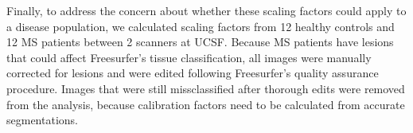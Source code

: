 Finally, to address the concern about whether these scaling factors could apply to a disease population, we calculated scaling factors from 12 healthy controls and 12 MS patients between 2 scanners at UCSF. Because MS patients have lesions that could affect Freesurfer's tissue classification, all images were manually corrected for lesions and were edited following Freesurfer's quality assurance procedure. Images that were still missclassified after thorough edits were removed from the analysis, because calibration factors need to be calculated from accurate segmentations.